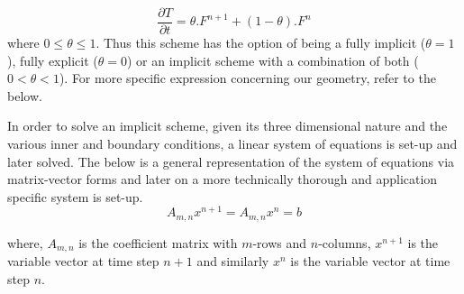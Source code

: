 \documentclass[a4paper,10pt]{IEEEtran}
\begin{document}
	\begin{equation}
	\frac{\partial T}{\partial t} = \theta.F^{n+1} + (1-\theta).F^{n}
	\end{equation}
	where $0 \le \theta \le 1$. Thus this scheme has the option of being a fully implicit ($\theta = 1$), fully explicit ($\theta = 0$) or an implicit scheme with a combination of both ($0 < \theta < 1$). For more specific expression concerning our geometry, refer to the below.
	 
%	

	In order to solve an implicit scheme, given its three dimensional nature and the various inner and boundary conditions, a linear system of equations is set-up and later solved. The below is a general representation of the system of equations via matrix-vector forms and later on a more technically thorough and application specific system is set-up.
	$$ A_{m,n}x^{n+1}=A_{m,n}x^n = b $$
	
	where, $A_{m,n}$ is the coefficient matrix with $m$-rows and $n$-columns, $x^{n+1}$ is the variable vector at time step $n+1$ and similarly $x^n$ is the variable vector at time step $n$.
	
\end{document}
